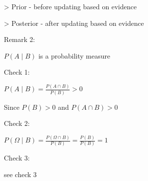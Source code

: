 \documentclass[12 pt]{article}
\begin{document}
> Prior - before updating based on evidence

> Posterior - after updating based on evidence

Remark 2:

\(P(A \mid B)\) is a probability measure

Check 1:

\(P(A \mid B) = \frac{P(A \cap B)}{P(B)} > 0\)

Since \(P(B) > 0\) and \(P(A \cap B) > 0\)

Check 2:

\(P(\Omega \mid B) = \frac{P(\Omega \cap B)}{P(B)} = \frac{P(B)}{P(B)} = 1\)

Check 3:

see check 3
\end{document}
